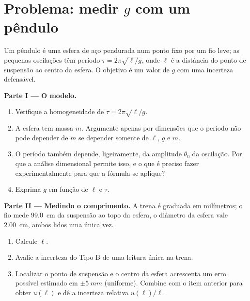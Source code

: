 \section{Problema: medir $g$ com um pêndulo}

\begin{problem}
\label{pb:b1:units-dimensions:1}
Um pêndulo é uma esfera de aço pendurada num ponto fixo por um fio leve;
as pequenas oscilações têm período $\tau = 2\pi\sqrt{\ell/g}$, onde $\ell$
é a distância do ponto de suspensão ao centro da esfera. O objetivo é um
valor de $g$ com uma incerteza defensável.

\medskip
\noindent\textbf{Parte I --- O modelo.}
\begin{enumerate}
  \item Verifique a homogeneidade de $\tau = 2\pi\sqrt{\ell/g}$.
  \item A esfera tem massa $m$. Argumente apenas por dimensões que o
        período não pode depender de $m$ se depender somente de $\ell$, $g$
        e $m$.
  \item O período também depende, ligeiramente, da amplitude $\theta_0$
        da oscilação. Por que a análise dimensional permite isso, e o que é
        preciso fazer experimentalmente para que a fórmula se aplique?
  \item Exprima $g$ em função de $\ell$ e $\tau$.
\end{enumerate}

\medskip
\noindent\textbf{Parte II --- Medindo o comprimento.}
A trena é graduada em milímetros; o fio mede \qty{99.0}{cm} da suspensão
ao topo da esfera, o diâmetro da esfera vale \qty{2.00}{cm}, ambos lidos
uma única vez.
\begin{enumerate}[resume]
  \item Calcule $\ell$.
  \item Avalie a incerteza do Tipo B de uma leitura única na trena.
  \item Localizar o ponto de suspensão e o centro da esfera acrescenta um
        erro possível estimado em $\pm\qty{5}{mm}$ (uniforme). Combine com
        o item anterior para obter $u(\ell)$ e dê a incerteza relativa
        $u(\ell)/\ell$.
\end{enumerate}


\end{problem}
